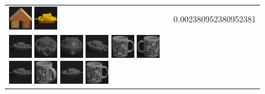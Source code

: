 \begin{figure}[tbp]
\begin{center}
\begin{tabular}{m{11cm} | m{3cm} |}
\includegraphics[width=1cm]{coil/beeld-43.eps}
\includegraphics[width=1cm]{coil/beeld-12.eps}
& {\scriptsize 0.002380952380952381}
\\
\includegraphics[width=1cm]{coil/beeld-24.eps}
\includegraphics[width=1cm]{coil/beeld-26.eps}
\includegraphics[width=1cm]{coil/beeld-28.eps}
\includegraphics[width=1cm]{coil/beeld-25.eps}
\includegraphics[width=1cm]{coil/beeld-48.eps}
\includegraphics[width=1cm]{coil/beeld-51.eps}
\includegraphics[width=1cm]{coil/beeld-24.eps}
\includegraphics[width=1cm]{coil/beeld-49.eps}
\includegraphics[width=1cm]{coil/beeld-27.eps}
\includegraphics[width=1cm]{coil/beeld-48.eps}

\end{tabular}
\end{center}
\end{figure}
